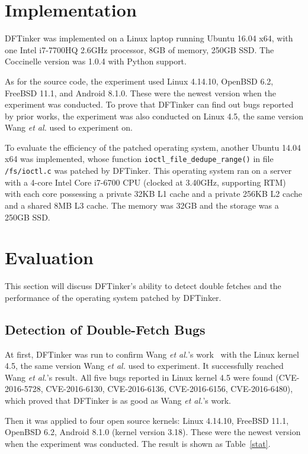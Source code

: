 \documentclass[10pt]{llncs}
\begin{document}
\section{Implementation}%
\label{imple}
DFTinker was implemented on a Linux laptop running Ubuntu 16.04 x64, with one Intel i7-7700HQ 2.6GHz processor, 8GB of memory, 250GB SSD. The Coccinelle version was 1.0.4 with Python support.

As for the source code, the experiment used Linux 4.14.10, OpenBSD 6.2, FreeBSD 11.1, and Android 8.1.0. These were the newest version when the experiment was conducted. To prove that DFTinker can find out bugs reported by prior works, the experiment was also conducted on Linux 4.5, the same version Wang \textit{et al.} used to experiment on.

To evaluate the efficiency of the patched operating system, another Ubuntu 14.04 x64 was implemented, whose function \verb:ioctl_file_dedupe_range(): in file \texttt{/fs/ioctl.c} was patched by DFTinker. This operating system ran on a server with a 4-core Intel Core i7-6700 CPU (clocked at 3.40GHz, supporting RTM) with each core possessing a private 32KB L1 cache and a private 256KB L2 cache and a shared 8MB L3 cache. The memory was 32GB and the storage was a 250GB SSD.

\section{Evaluation}%
\label{evalue}
This section will discuss DFTinker's ability to detect double fetches and the performance of the operating system patched by DFTinker.
\subsection{Detection of Double-Fetch Bugs}
\label{evalue1}


At first, DFTinker was run to confirm Wang \textit{et al.}'s work~\cite{wang} with the Linux kernel 4.5, the same version Wang \textit{et al.} used to experiment. It successfully reached Wang \textit{et al.}'s result. All five bugs reported in Linux kernel 4.5 were found (CVE-2016-5728, CVE-2016-6130, CVE-2016-6136, CVE-2016-6156, CVE-2016-6480), which proved that DFTinker is as good as Wang \textit{et al.}'s work.

Then it was applied to four open source kernels: Linux 4.14.10, FreeBSD 11.1, OpenBSD 6.2, Android 8.1.0 (kernel version 3.18). These were the newest version when the experiment was conducted. The result is shown as Table~\ref{stat}.
\end{document}
